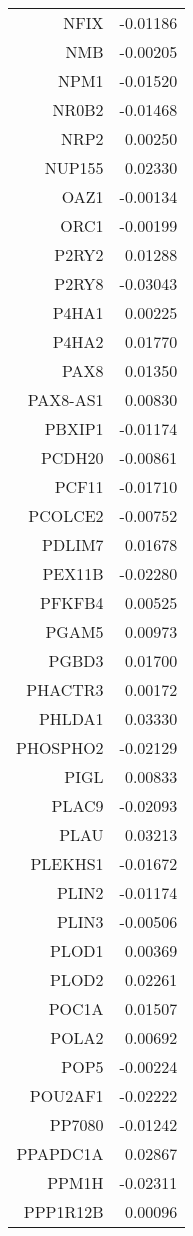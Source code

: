 \begin{longtable}{rr}
  NFIX & -0.01186 \\ 
  NMB & -0.00205 \\ 
  NPM1 & -0.01520 \\ 
  NR0B2 & -0.01468 \\ 
  NRP2 & 0.00250 \\ 
  NUP155 & 0.02330 \\ 
  OAZ1 & -0.00134 \\ 
  ORC1 & -0.00199 \\ 
  P2RY2 & 0.01288 \\ 
  P2RY8 & -0.03043 \\ 
  P4HA1 & 0.00225 \\ 
  P4HA2 & 0.01770 \\ 
  PAX8 & 0.01350 \\ 
  PAX8-AS1 & 0.00830 \\ 
  PBXIP1 & -0.01174 \\ 
  PCDH20 & -0.00861 \\ 
  PCF11 & -0.01710 \\ 
  PCOLCE2 & -0.00752 \\ 
  PDLIM7 & 0.01678 \\ 
  PEX11B & -0.02280 \\ 
  PFKFB4 & 0.00525 \\ 
  PGAM5 & 0.00973 \\ 
  PGBD3 & 0.01700 \\ 
  PHACTR3 & 0.00172 \\ 
  PHLDA1 & 0.03330 \\ 
  PHOSPHO2 & -0.02129 \\ 
  PIGL & 0.00833 \\ 
  PLAC9 & -0.02093 \\ 
  PLAU & 0.03213 \\ 
  PLEKHS1 & -0.01672 \\ 
  PLIN2 & -0.01174 \\ 
  PLIN3 & -0.00506 \\ 
  PLOD1 & 0.00369 \\ 
  PLOD2 & 0.02261 \\ 
  POC1A & 0.01507 \\ 
  POLA2 & 0.00692 \\ 
  POP5 & -0.00224 \\ 
  POU2AF1 & -0.02222 \\ 
  PP7080 & -0.01242 \\ 
  PPAPDC1A & 0.02867 \\ 
  PPM1H & -0.02311 \\ 
  PPP1R12B & 0.00096 \\ 

\end{longtable}
